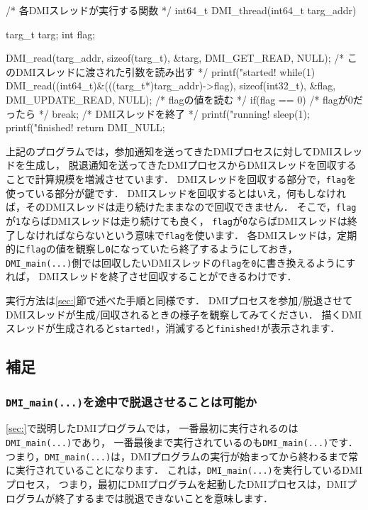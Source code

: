 \documentclass[report,12pt]{jsbook}
\begin{document}
\begin{code}
/* 各DMIスレッドが実行する関数 */
int64_t DMI_thread(int64_t targ_addr)
{
  targ_t targ;
  int flag;

  DMI_read(targ_addr, sizeof(targ_t), &targ, DMI_GET_READ, NULL);  /* このDMIスレッドに渡された引数を読み出す */
  printf("started! %
  while(1)
    {
      DMI_read((int64_t)&(((targ_t*)targ_addr)->flag), sizeof(int32_t), &flag, DMI_UPDATE_READ, NULL);  /* flagの値を読む */
      if(flag == 0)  /* flagが0だったら */
        {
          break;  /* DMIスレッドを終了 */
        }
      printf("running! %
      sleep(1);
    }
  printf("finished! %
  return DMI_NULL;
}
\end{code}

上記のプログラムでは，参加通知を送ってきたDMIプロセスに対してDMIスレッドを生成し，
脱退通知を送ってきたDMIプロセスからDMIスレッドを回収することで計算規模を増減させています．
DMIスレッドを回収する部分で，\texttt{flag}を使っている部分が鍵です．
DMIスレッドを回収するとはいえ，何もしなければ，そのDMIスレッドは走り続けたままなので回収できません．
そこで，\texttt{flag}が\texttt{1}ならばDMIスレッドは走り続けても良く，
\texttt{flag}が\texttt{0}ならばDMIスレッドは終了しなければならないという意味で\texttt{flag}を使います．
各DMIスレッドは，定期的に\texttt{flag}の値を観察し\texttt{0}になっていたら終了するようにしておき，
\texttt{DMI\_main(...)}側では回収したいDMIスレッドの\texttt{flag}を\texttt{0}に書き換えるようにすれば，
DMIスレッドを終了させ回収することができるわけです．

実行方法は\ref{sec:}節で述べた手順と同様です．
DMIプロセスを参加/脱退させてDMIスレッドが生成/回収されるときの様子を観察してみてください．
描くDMIスレッドが生成されると\texttt{started!}，消滅すると\texttt{finished!}が表示されます．

\subsection{補足}

\subsubsection{\texttt{DMI\_main(...)}を途中で脱退させることは可能か}

\ref{sec:}で説明したDMIプログラムでは，
一番最初に実行されるのは\texttt{DMI\_main(...)}であり，
一番最後まで実行されているのも\texttt{DMI\_main(...)}です．
つまり，\texttt{DMI\_main(...)}は，DMIプログラムの実行が始まってから終わるまで常に実行されていることになります．
これは，\texttt{DMI\_main(...)}を実行しているDMIプロセス，
つまり，最初にDMIプログラムを起動したDMIプロセスは，DMIプログラムが終了するまでは脱退できないことを意味します．
\end{document}
